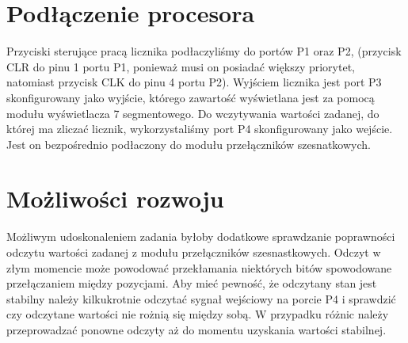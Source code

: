 \documentclass[fleqn]{article}
\begin{document}


\pagebreak



\pagebreak

\section{Podłączenie procesora}


Przyciski sterujące pracą licznika podłaczyliśmy do portów P1 oraz P2, (przycisk CLR do pinu 1 portu P1, ponieważ musi on posiadać większy priorytet, natomiast przycisk CLK do pinu 4 portu P2). Wyjściem licznika jest port P3 skonfigurowany jako wyjście, którego zawartość wyświetlana jest za pomocą modułu wyświetlacza 7 segmentowego. Do wczytywania wartości zadanej, do której ma zliczać licznik, wykorzystaliśmy port P4 skonfigurowany jako wejście. Jest on bezpośrednio podłaczony do modułu przełączników szesnatkowych.

\section{Możliwości rozwoju}

Możliwym udoskonaleniem zadania byłoby dodatkowe sprawdzanie poprawności odczytu wartości zadanej z modułu przełączników szesnastkowych. Odczyt w złym momencie może powodować przekłamania niektórych bitów spowodowane przełączaniem między pozycjami. Aby mieć pewność, że odczytany stan jest stabilny należy kilkukrotnie odczytać sygnał wejściowy na porcie P4 i sprawdzić czy odczytane wartości nie rożnią się między sobą. W przypadku różnic należy przeprowadzać ponowne odczyty aż do momentu uzyskania wartości stabilnej.
\end{document}
